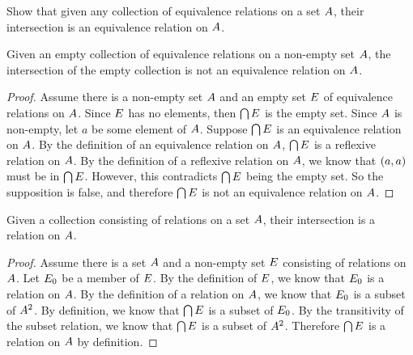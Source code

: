 \documentclass[main.tex]{subfiles}
\begin{document}
\subproblem{}\label{s03p05b}

Show that given any collection of equivalence relations on a set \({A}\),
their intersection is an equivalence relation on \({A}\).

\begin{lemma}
	Given an empty collection of equivalence relations on a non-empty set
	\({A}\), the intersection of the empty collection is not an
	equivalence relation on \({A}\).
\end{lemma}
\begin{proof}
	Assume there is a non-empty set \({A}\) and an empty set
	\({E}\) of equivalence relations on \({A}\). Since
	\({E}\) has no elements, then \(\bigcap {E}\) is the
	empty set. Since \({A}\) is non-empty, let \(a\) be some element
	of \({A}\). Suppose \(\bigcap {E}\) is an
	equivalence relation on \({A}\). By the definition of an
	equivalence relation on \({A}\), \(\bigcap {E}\) is a
	reflexive relation on \({A}\). By the definition of a reflexive
	relation on \({A}\), we know that \(({a},{a})\) must be in
	\(\bigcap {E}\). However, this contradicts
	\(\bigcap {E}\) being the empty set. So the supposition is
	false, and therefore \(\bigcap {E}\) is not an equivalence
	relation on \({A}\).
\end{proof}

\begin{lemma}
	Given a collection consisting of relations on a set \({A}\),
	their intersection is a relation on \({A}\).
\end{lemma}
\begin{proof}
	Assume there is a set \({A}\) and a non-empty set \({E}\)
	consisting of relations on \({A}\). Let \({E_0}\) be a
	member of \({E}\). By the definition of \({E}\), we know
	that \({E_0}\) is a relation on \({A}\). By the definition
	of a relation on \({A}\), we know that \({E_0}\) is a
	subset of \({A}^2\). By definition, we know that
	\(\bigcap {E}\) is a subset of \({E_0}\). By the
	transitivity of the subset relation, we know that
	\(\bigcap {E}\) is a subset of \({A}^2\). Therefore
	\(\bigcap {E}\) is a relation on \({A}\) by definition.
\end{proof}
\end{document}
